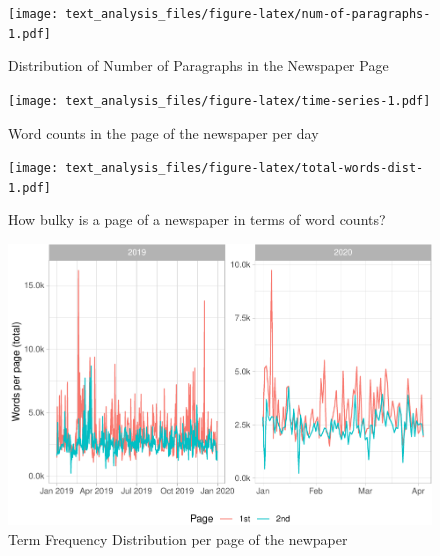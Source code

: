 \documentclass[
  12pt,
]{article}
\begin{document}
\begin{figure}
\centering
\texttt{[image: text\_analysis\_files/figure-latex/num-of-paragraphs-1.pdf]}
\caption{\label{fig:num-of-paragraphs}Distribution of Number of Paragraphs in the Newspaper Page}
\end{figure}

\begin{figure}
\centering
\texttt{[image: text\_analysis\_files/figure-latex/time-series-1.pdf]}
\caption{\label{fig:time-series}Word counts in the page of the newspaper per day}
\end{figure}

\begin{figure}
\centering
\texttt{[image: text\_analysis\_files/figure-latex/total-words-dist-1.pdf]}
\caption{\label{fig:total-words-dist}How bulky is a page of a newspaper in terms of word counts?}
\end{figure}

\begin{figure}
\centering
\includegraphics{text_analysis_files/figure-latex/unnamed-chunk-2-1.pdf}
\caption{\label{fig:unnamed-chunk-2}Term Frequency Distribution per page of the newpaper}
\end{figure}
\end{document}
